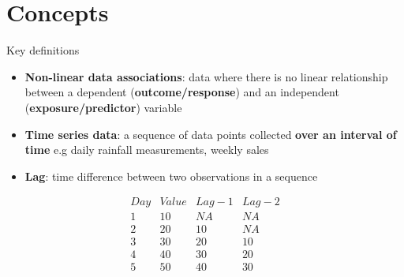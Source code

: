 \documentclass[english]{beamer}
\newcommand{\alertblue}[1]{{\color{blue}#1}}
\begin{document}
\section{Concepts}
\begin{frame}{Key definitions}
   \begin{itemize}
    \item \alertblue{\textbf{Non-linear data associations}}: data where there is no linear relationship between a dependent (\alertblue{\textbf{outcome/response}}) and an independent (\alertblue{\textbf{exposure/predictor}}) variable \\
    \item \alertblue{\textbf{Time series data}}: a sequence of data points collected \alertblue{\textbf{over an interval of time}} e.g daily rainfall measurements, weekly sales \\
    \item \alertblue{\textbf{Lag}}: time difference between two observations in a sequence
    \end{itemize}
    \vspace{0.25cm}
    \centering
    \[\begin{array}{|c|c|c|c|}
    {Day} & {Value} & {Lag-1} & {Lag-2}\\ \hline
    1 & 10 & NA & NA \\
    2 & 20 & 10 & NA \\
    3 & 30 & 20 & 10 \\
    4 & 40 & 30 & 20 \\
    5 & 50 & 40 & 30 
\end{array}\] 
\end{frame}
\end{document}
